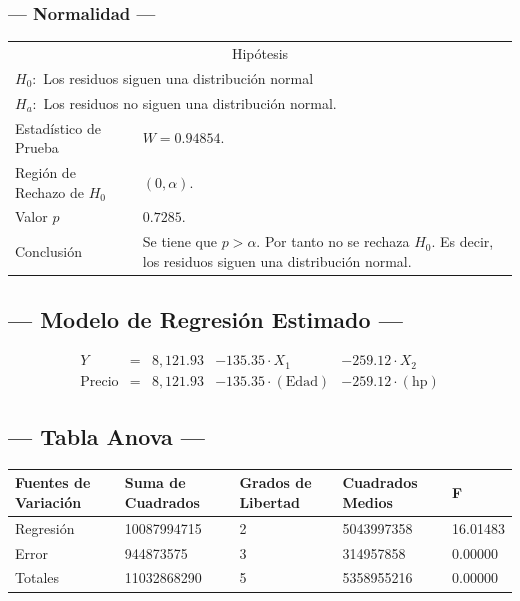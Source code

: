 \subsubsection{--- Normalidad ---} %
\begin{center}
  \begin{tabular}{|l|p{8cm}|}
    \cline{1-2}
    \multicolumn{2}{|c|}{Hipótesis}\\ \cline{1-2}
    \multicolumn{2}{|l|}{\(H_0:\) Los residuos siguen una distribución normal} \\ 
    \multicolumn{2}{|l|}{\(H_a:\) Los residuos no siguen una distribución normal.} \\ \cline{1-2}
    Estadístico de Prueba & \(W = 0.94854\).\\ \cline{1-2} 
		Región de Rechazo de \(H_0\) & \((0, \alpha )\).\\ \cline{1-2} 
    Valor \(p\) & \(0.7285\).\\ \cline{1-2} 
    Conclusión & Se tiene que \(p> \alpha\). \newline 
		Por tanto no se rechaza \(H_0\). \newline 
		Es decir, los residuos siguen una distribución normal.\\ \cline{1-2} 
  \end{tabular}
\end{center}


\subsection{\centering --- Modelo de Regresión Estimado ---} %
\begin{align}
	Y & = &              8,121.93 & - 135.35 \cdot X_1           & - 259.12     \cdot X_2   \\[2mm]
	\mbox{Precio} & = &  8,121.93 & - 135.35 \cdot (\mbox{Edad}) & - 259.12     \cdot (\mbox{hp})
	\label{eq:4}
\end{align}

\subsection{\centering --- Tabla Anova ---} %
\begin{center}
  \begin{tabular}{|l|l|l|l|l|}
    \hline 
    Fuentes de Variación  & Suma de Cuadrados & Grados de Libertad & Cuadrados Medios & F\\ \hline 
Regresión  &  10087994715          &  2       & 5043997358 & 16.01483\\ \hline
Error      &    944873575          &  3       &  314957858 &  0.00000\\ \hline
Totales    &  11032868290          &  5       & 5358955216 &  0.00000\\ \hline
  \end{tabular}
\end{center} 

